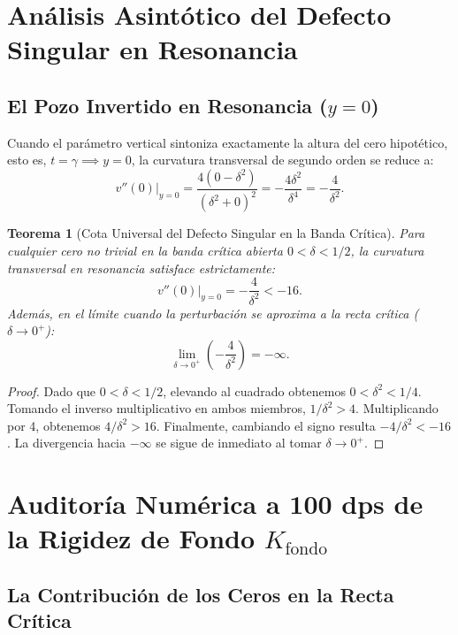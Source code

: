 \documentclass[11pt,a4paper]{article}
\newtheorem{theorem}{Teorema}[section]
\theoremstyle{definition}
\theoremstyle{remark}
\begin{document}
\section{Análisis Asintótico del Defecto Singular en Resonancia}

\subsection{El Pozo Invertido en Resonancia \texorpdfstring{($y = 0$)}{(y = 0)}}

Cuando el parámetro vertical sintoniza exactamente la altura del cero hipotético, esto es, $t = \gamma \implies y = 0$, la curvatura transversal de segundo orden se reduce a:
\begin{equation}
v''(0)\Big|_{y=0} = \frac{4(0 - \delta^2)}{(\delta^2 + 0)^2} = -\frac{4\delta^2}{\delta^4} = -\frac{4}{\delta^2}.
\end{equation}

\begin{theorem}[Cota Universal del Defecto Singular en la Banda Crítica]
Para cualquier cero no trivial en la banda crítica abierta $0 < \delta < 1/2$, la curvatura transversal en resonancia satisface estrictamente:
\begin{equation}
v''(0)\Big|_{y=0} = -\frac{4}{\delta^2} < -16.
\end{equation}
Además, en el límite cuando la perturbación se aproxima a la recta crítica ($\delta \to 0^+$):
\begin{equation}
\lim_{\delta \to 0^+} \left( -\frac{4}{\delta^2} \right) = -\infty.
\end{equation}
\end{theorem}

\begin{proof}
Dado que $0 < \delta < 1/2$, elevando al cuadrado obtenemos $0 < \delta^2 < 1/4$. Tomando el inverso multiplicativo en ambos miembros, $1/\delta^2 > 4$. Multiplicando por 4, obtenemos $4/\delta^2 > 16$. Finalmente, cambiando el signo resulta $-4/\delta^2 < -16$. 
La divergencia hacia $-\infty$ se sigue de inmediato al tomar $\delta \to 0^+$.
\end{proof}

\section{Auditoría Numérica a 100 dps de la Rigidez de Fondo \texorpdfstring{$K_{\text{fondo}}$}{K fondo}}

\subsection{La Contribución de los Ceros en la Recta Crítica}
\end{document}
